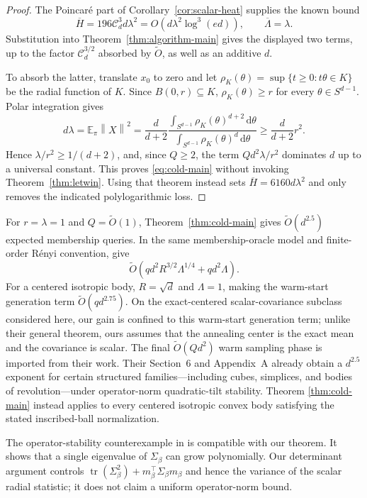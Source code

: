 \documentclass[11pt]{article}
\theoremstyle{remark}
\newcommand{\E}{\mathbb E}
\newcommand{\1}{\bm 1}
\newcommand{\tr}{\operatorname{tr}}
\newcommand{\dd}{\,\mathrm d}
\newcommand{\norm}[1]{\left\lVert #1\right\rVert}
\begin{document}
\begin{proof}
The Poincar\'e part of Corollary~\ref{cor:scalar-heat} supplies the
known bound
\[
  \overline H=196\mathcal C_d^3d\lambda^2
  =O\!\left(d\lambda^2\log^3(ed)\right),
  \qquad \overline\Lambda=\lambda.
\]
Substitution into Theorem~\ref{thm:algorithm-main} gives the displayed
two terms, up to the factor $\mathcal C_d^{3/2}$ absorbed by
$\widetilde O$, as well as an additive $d$.

To absorb the latter, translate $x_0$ to zero and let
$\rho_K(\theta)=\sup\{t\geq0:t\theta\in K\}$ be the radial function of
$K$.  Since $B(0,r)\subseteq K$,
$\rho_K(\theta)\geq r$ for every $\theta\in S^{d-1}$.  Polar integration
gives
\[
  d\lambda=\E_\pi\norm X^2
  =\frac{d}{d+2}
    \frac{\int_{S^{d-1}}\rho_K(\theta)^{d+2}\dd\theta}
         {\int_{S^{d-1}}\rho_K(\theta)^d\dd\theta}
  \geq\frac{d}{d+2}r^2.
\]
Hence $\lambda/r^2\geq1/(d+2)$, and, since $Q\geq2$, the term
$Qd^2\lambda/r^2$ dominates $d$ up to a universal constant.  This
proves \eqref{eq:cold-main} without invoking Theorem~\ref{thm:letwin}.
Using that theorem instead sets $\overline H=6160d\lambda^2$ and only
removes the indicated polylogarithmic loss.
\end{proof}

For $r=\lambda=1$ and $Q=\widetilde O(1)$,
Theorem~\ref{thm:cold-main} gives
$\widetilde O(d^{2.5})$ expected membership queries.  In the same
membership-oracle model and finite-order R\'enyi convention,
\citet[Corollary~1.6]{KV26zeroth} give
\[
  \widetilde O\!\left(
    qd^2R^{3/2}\Lambda^{1/4}
    +qd^2\Lambda
  \right).
\]
For a centered isotropic body, $R=\sqrt d$ and $\Lambda=1$, making the
warm-start generation term $\widetilde O(qd^{2.75})$.  On the
exact-centered scalar-covariance subclass considered here, our gain is
confined to this warm-start generation term; unlike their general
theorem, ours assumes that the annealing center is the exact mean and
the covariance is scalar.  The final
$\widetilde O(Qd^2)$ warm sampling phase is imported from their work.
Their Section~6 and Appendix~A already obtain a $d^{2.5}$ exponent for certain
structured families---including cubes, simplices, and bodies of
revolution---under operator-norm quadratic-tilt stability.  Theorem
\ref{thm:cold-main} instead applies to every centered isotropic convex
body satisfying the stated inscribed-ball normalization.

The operator-stability counterexample in
\citet[Proposition~6.3]{KV26zeroth} is compatible with our theorem.  It
shows that a single eigenvalue of $\Sigma_\beta$ can grow polynomially.
Our determinant argument controls
$\tr(\Sigma_\beta^2)+m_\beta^\top\Sigma_\beta m_\beta$ and hence the
variance of the scalar radial statistic; it does not claim a uniform
operator-norm bound.
\end{document}
